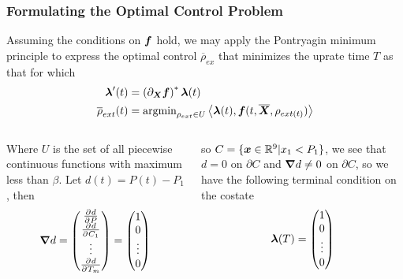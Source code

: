\documentclass[10pt,compress]{beamer}
\begin{document}
\begin{frame}\frametitle{Formulating the Optimal Control Problem}
    Assuming the conditions on $\boldsymbol{f}$ hold, we may apply the Pontryagin minimum principle to express the optimal control $\overline{\rho}_{ex}$ that
    minimizes the uprate time $T$ as that for which
    \begin{equation}
        \begin{split}
            \boldsymbol{\lambda}'(t) &= \left(\partial_{\boldsymbol{X}}\boldsymbol{f}\right)^*\boldsymbol{\lambda}(t)\nonumber\\
            \overline{\rho}_{ext}(t) &= \text{argmin}_{\rho_{ext}\in U}\left\langle \boldsymbol{\lambda}(t), \boldsymbol{f}(t, \overline{\boldsymbol{X}}, \rho_{{ext}(t)})\right\rangle\nonumber
        \end{split}
    \end{equation}
    \begin{columns}
        \begin{column}{5cm}
            Where $U$ is the set of all piecewise continuous functions with maximum less than $\beta$. Let $d(t) = P(t)-P_1$, then
            \begin{equation}
                \boldsymbol{\nabla}d = \begin{pmatrix}
                    \frac{\partial^{} d}{\partial^{} P}\\
                    \frac{\partial^{} d}{\partial^{} C_1}\\
                    \vdots\\
                    \frac{\partial^{} d}{\partial^{} T_m}
                \end{pmatrix}=\begin{pmatrix}
                    1\\
                    0\\
                    \vdots\\
                    0
                \end{pmatrix}\nonumber
            \end{equation}
        \end{column}
        \begin{column}{5cm}
            so $C=\{\boldsymbol{x}\in \mathbb{R}^9| x_1 < P_1\}$, we see that $d=0$ on $\partial C$ and $\boldsymbol{\nabla}d\neq 0$ on $\partial C$, so
            we have the following terminal condition on the costate
            \begin{equation}
                \boldsymbol{\lambda}(T) = \begin{pmatrix}
                    1\\
                    0\\
                    \vdots\\
                    0
                \end{pmatrix}\nonumber
            \end{equation}
        \end{column}
    \end{columns}
\end{frame}
\end{document}
